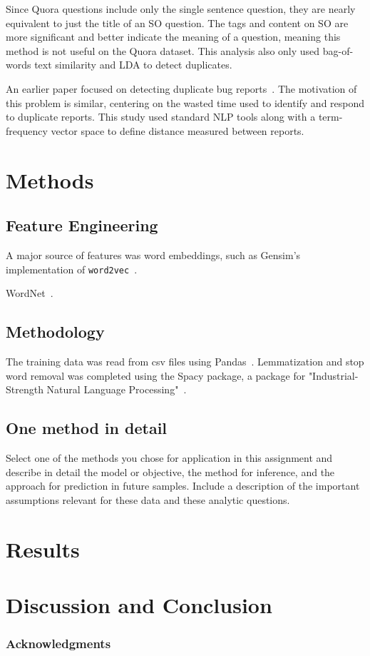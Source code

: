 \documentclass{article} %
\begin{document}
Since Quora questions include only the single sentence question, they are nearly equivalent to just the title of an SO question. The tags and content on SO are more significant and better indicate the meaning of a question, meaning this method is not useful on the Quora dataset. This analysis also only used bag-of-words text similarity and LDA to detect duplicates.

An earlier paper focused on detecting duplicate bug reports~\cite{Runeson2007}. The motivation of this problem is similar, centering on the wasted time used to identify and respond to duplicate reports. This study used standard NLP tools along with a term-frequency vector space to define distance measured between reports. 

\section{Methods}

\subsection{Feature Engineering}

A major source of features was word embeddings, such as Gensim's implementation of \texttt{word2vec}~\cite{gensim}.

WordNet~\cite{wordnet}.

\subsection{Methodology}

The training data was read from csv files using Pandas~\cite{pandas}. Lemmatization and stop word removal was completed using the Spacy package, a package for "Industrial-Strength Natural Language Processing"~\cite{spacy}. 

\subsection{One method in detail}

Select one of the methods you chose for application in this assignment and describe in detail the model or objective, the method for inference, and the approach for prediction in future samples. Include a description of the important assumptions relevant for these data and these analytic questions.

\section{Results}

\section{Discussion and Conclusion}

\subsubsection*{Acknowledgments}


\printbibliography
\end{document}
